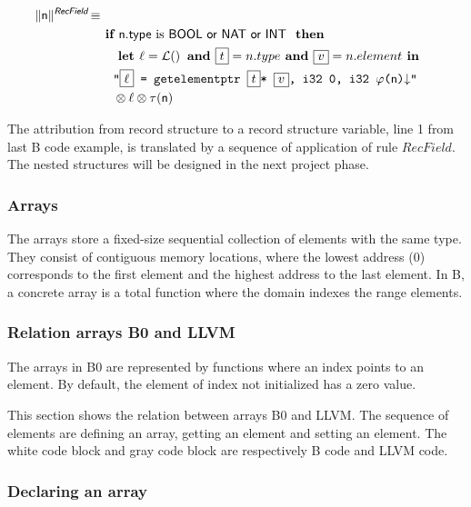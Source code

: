 \begin{align*}
\begin{split}
  \trad{n}{\B{RecField}} \isdef \\
   & \IF \B{n.type} \mbox{ is \B{BOOL or NAT or INT} } \THEN \\
   &\quad  \LET \ell = \lbl  \AND  \PH{t} = n.type \AND \PH{v} = n.element \IN\\
   &\quad  \llvm{"\PH{\ell} = getelementptr \PH{t}* \PH{v}, i32 0, i32  \SBPos(\B{n})\nl"} \\
   &\quad  \sep  \ell  \sep \SBType(\B{n})\\
\end{split}
\end{align*}

The attribution from record structure to a record structure variable, line 1 
from last B code example, is translated by a sequence of application of rule 
$RecField$. The nested structures will be designed in the next project phase.

\subsubsection{Arrays}

The arrays store a fixed-size sequential collection of elements with the same type. 
They consist of contiguous memory locations, where the lowest address (0) 
corresponds to the first element and the highest address to the last element.
In B, a concrete array is a total function where the domain indexes the range 
elements. 




\subsubsection{Relation arrays B0 and LLVM}

The arrays in B0 are represented by functions where an index points to an 
element. By default, the element of index not initialized has a zero value. 

This section shows the relation between arrays B0 and LLVM. The sequence of
elements are defining an array, getting an element and setting an
element. The white code block and gray code block are respectively B code and LLVM code.

\subsubsection{Declaring an array}


